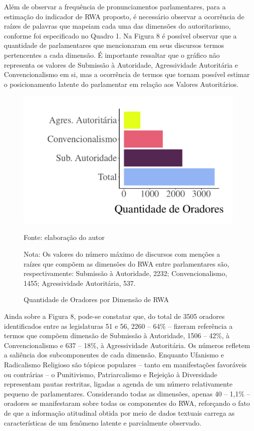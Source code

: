 \documentclass[
12pt,				%
openright,			%
twoside,			%
a4paper,			%
english,			%
french,				%
spanish,			%
brazil				%
]{abntex2}
\begin{document}
Além de observar a frequência de pronunciamentos parlamentares, para a estimação do indicador de RWA proposto, é necessário observar a ocorrência de raízes de palavras que mapeiam cada uma das dimensões do autoritarismo, conforme foi especificado no Quadro 1. Na Figura 8 é possível observar que a quantidade de parlamentares que mencionaram em seus discursos termos pertencentes a cada dimensão. É importante ressaltar que o gráfico não representa os valores de Submissão à Autoridade, Agressividade Autoritária e Convencionalismo em si, mas a ocorrência de termos que tornam possível estimar o posicionamento latente do parlamentar em relação aos Valores Autoritários.

\begin{figure}[h]
	\caption{Quantidade de Oradores por Dimensão de RWA}
	\label{fig:qtd_deps_rwa}
	\centering
	\includegraphics[width=.6\linewidth]{figures/qtd_oradores_rwa}
	
	Fonte: elaboração do autor
	\begin{flushleft}
	Nota: Os valores do número máximo de discursos com menções a raízes que compõem as dimensões do RWA entre parlamentares são, respectivamente: Submissão à Autoridade, 2232; Convencionalismo, 1455; Agressividade Autoritária, 537. 
	\end{flushleft} 	
\end{figure}

Ainda sobre a Figura 8, pode-se constatar que, do total de 3505 oradores identificados entre as legislaturas 51 e 56, 2260 -- 64{\%} -- fizeram referência a termos que compõem dimensão de Submissão à Autoridade, 1506 -- 42{\%}, à Convencionalismo e 637 -- 18{\%}, à Agressividade Autoritária. Os números refletem a saliência dos subcomponentes de cada dimensão. Enquanto Ufanismo e Radicalismo Religioso são tópicos populares -- tanto em manifestações favoráveis ou contrárias -- o Punitivismo, Patriarcalismo e Rejeição à Diversidade representam pautas restritas, ligadas a agenda de um número relativamente pequeno de parlamentares. Considerando todas as dimensões, apenas 40 -- 1,1{\%} -- oradores se manifestaram sobre todas os componentes do RWA, reforçando o fato de que a informação atitudinal obtida por meio de dados textuais carrega as características de um fenômeno latente e parcialmente observado. 
\end{document}
